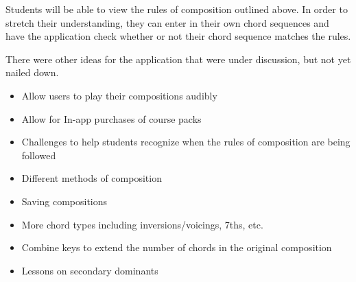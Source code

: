 \documentclass[onecolumn, draftclsnofoot,10pt, compsoc]{IEEEtran}
\begin{document}
    \par
    Students will be able to view the rules of composition outlined above.
    In order to stretch their understanding, they can enter in their own chord sequences and have the application check whether or not their chord sequence matches the rules.
    
    \par
    There were other ideas for the application that were under discussion, but not yet nailed down.
    \begin{itemize}
    \item Allow users to play their compositions audibly
    \item Allow for In-app purchases of course packs
    \item Challenges to help students recognize when the rules of composition are being followed
    \item Different methods of composition
    \item Saving compositions
    \item More chord types including inversions/voicings, 7ths, etc.
    \item Combine keys to extend the number of chords in the original composition
    \item Lessons on secondary dominants
    \end {itemize}
    \clearpage
    
\end{document}
